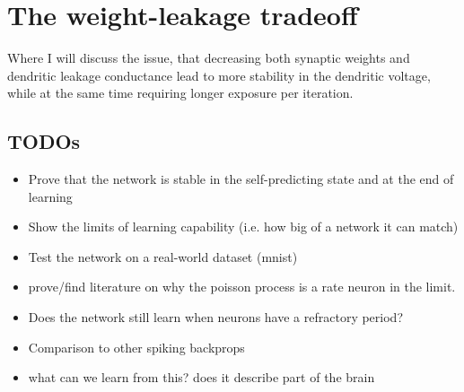 \documentclass[11pt,a4paper,titlepage]{report}
\begin{document}
\chapter{The weight-leakage tradeoff}

Where I will discuss the issue, that decreasing both synaptic weights and dendritic leakage conductance
lead to more stability in the dendritic voltage, while at the same time requiring longer exposure
per iteration.


\section*{TODOs}

\begin{itemize}
  \item Prove that the network is stable in the self-predicting state and at the end of learning
  \item Show the limits of learning capability (i.e. how big of a network it can match)
  \item Test the network on a real-world dataset (mnist)
  \item prove/find literature on why the poisson process is a rate neuron in the limit.
  \item Does the network still learn when neurons have a refractory period?
  \item Comparison to other spiking backprops
  \item what can we learn from this? does it describe part of the brain
\end{itemize}

\newpage

\end{document}
